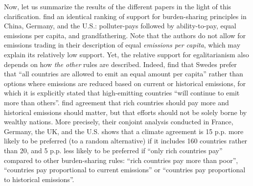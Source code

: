 Now, let us summarize the results of the different papers in the light of this clarification. 
\citet{schleich_citizens_2016} find an identical ranking of support for burden-sharing principles in China, Germany, and the U.S.: polluter-pays followed by ability-to-pay, equal emissions per capita, and grandfathering. 
Note that the authors do not allow for emissions trading in their description of equal \textit{emissions per capita}, which may explain its relatively low support. 
Yet, the relative support for egalitarianism also depends on how \textit{the other} rules are described. Indeed, \citet{carlsson_is_2011} find that Swedes prefer that ``all countries are allowed to emit an equal amount per capita'' rather than options where emissions are reduced based on current or historical emissions, for which it is explicitly stated that high-emitting countries ``will continue to emit more than others''. 
\citet{bechtel_mass_2013} find agreement that rich countries should pay more and historical emissions should matter, but that efforts should not be solely borne by wealthy nations. More precisely, their conjoint analysis conducted in France, Germany, the UK, and the U.S. shows that a climate agreement is 15 p.p. more likely to be preferred  (to a random alternative) if it includes 160 countries rather than 20, and 5 p.p. less likely to be preferred if ``only rich countries pay'' compared to other burden-sharing rules: ``rich countries pay more than poor'', ``countries pay proportional to current emissions'' or ``countries pay proportional to historical emissions''. %
